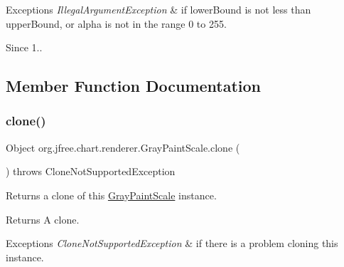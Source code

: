 \begin{DoxyExceptions}{Exceptions}
{\em Illegal\+Argument\+Exception} & if {\ttfamily lower\+Bound} is not less than {\ttfamily upper\+Bound}, or {\ttfamily alpha} is not in the range 0 to 255.\\
\hline
\end{DoxyExceptions}
\begin{DoxySince}{Since}
1.. 
\end{DoxySince}


\subsection{Member Function Documentation}
\mbox{\label{classorg_1_1jfree_1_1chart_1_1renderer_1_1_gray_paint_scale_aa6c17936614a809587e077d5cb7aedd2}} 
\subsubsection{\texorpdfstring{clone()}{clone()}}
{\footnotesize\ttfamily Object org.\+jfree.\+chart.\+renderer.\+Gray\+Paint\+Scale.\+clone (\begin{DoxyParamCaption}{ }\end{DoxyParamCaption}) throws Clone\+Not\+Supported\+Exception}

Returns a clone of this {\ttfamily \mbox{\hyperlink{classorg_1_1jfree_1_1chart_1_1renderer_1_1_gray_paint_scale}{Gray\+Paint\+Scale}}} instance.

\begin{DoxyReturn}{Returns}
A clone.
\end{DoxyReturn}

\begin{DoxyExceptions}{Exceptions}
{\em Clone\+Not\+Supported\+Exception} & if there is a problem cloning this instance. \\
\hline
\end{DoxyExceptions}
\mbox{\label{classorg_1_1jfree_1_1chart_1_1renderer_1_1_gray_paint_scale_a01d2b763ac18311cf705fd6c8ebc3e6c}} 
